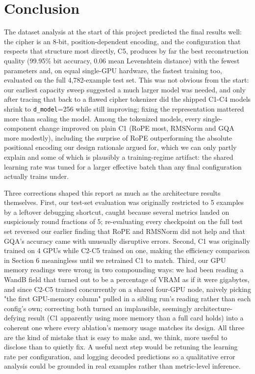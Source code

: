 \documentclass[12pt,a4paper]{article}
\begin{document}
\section{Conclusion}

The dataset analysis at the start of this project predicted the final results well: the cipher is an 8-bit, position-dependent encoding, and the configuration that respects that structure most directly, C5, produces by far the best reconstruction quality (99.95\% bit accuracy, 0.06 mean Levenshtein distance) with the fewest parameters and, on equal single-GPU hardware, the fastest training too, evaluated on the full 4,782-example test set. This was not obvious from the start: our earliest capacity sweep suggested a much larger model was needed, and only after tracing that back to a flawed cipher tokenizer did the shipped C1-C4 models shrink to \texttt{d\_model}=256 while still improving; fixing the representation mattered more than scaling the model. Among the tokenized models, every single-component change improved on plain C1 (RoPE most, RMSNorm and GQA more modestly), including the surprise of RoPE outperforming the absolute positional encoding our design rationale argued for, which we can only partly explain and some of which is plausibly a training-regime artifact: the shared learning rate was tuned for a larger effective batch than any final configuration actually trains under.

Three corrections shaped this report as much as the architecture results themselves. First, our test-set evaluation was originally restricted to 5 examples by a leftover debugging shortcut, caught because several metrics landed on suspiciously round fractions of 5; re-evaluating every checkpoint on the full test set reversed our earlier finding that RoPE and RMSNorm did not help and that GQA's accuracy came with unusually disruptive errors. Second, C1 was originally trained on 4 GPUs while C2-C5 trained on one, making the efficiency comparison in Section 6 meaningless until we retrained C1 to match. Third, our GPU memory readings were wrong in two compounding ways: we had been reading a WandB field that turned out to be a percentage of VRAM as if it were gigabytes, and since C2-C5 trained concurrently on a shared four-GPU node, naively picking "the first GPU-memory column" pulled in a sibling run's reading rather than each config's own; correcting both turned an implausible, seemingly architecture-defying result (C1 apparently using more memory than a full card holds) into a coherent one where every ablation's memory usage matches its design. All three are the kind of mistake that is easy to make and, we think, more useful to disclose than to quietly fix. A useful next step would be retuning the learning rate per configuration, and logging decoded predictions so a qualitative error analysis could be grounded in real examples rather than metric-level inference.
\end{document}
